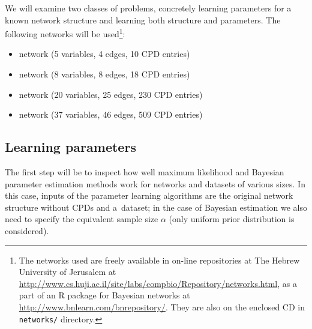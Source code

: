 \documentclass[english,cover]{fitthesis} %
\newcommand{\srccode}[1]{{\tt #1}}         %
\begin{document}
We will examine two classes of problems, concretely learning parameters for a known network structure and learning both structure and parameters. The following networks will be used\footnote{The networks used are freely available in on-line repositories at The Hebrew University of Jerusalem at \url{http://www.cs.huji.ac.il/site/labs/compbio/Repository/networks.html}, as a part of an R package for Bayesian networks at \url{http://www.bnlearn.com/bnrepository/}. They are also on the enclosed CD in \srccode{networks/} directory.}:
\begin{itemize}
	\item {} network (5 variables, 4 edges, 10 CPD entries)
	\item {} network (8 variables, 8 edges, 18 CPD entries)
	\item {} network (20 variables, 25 edges, 230 CPD entries)
	\item {} network (37 variables, 46 edges, 509 CPD entries)
\end{itemize}


\subsection{Learning parameters}
The first step will be to inspect how well maximum likelihood and Bayesian parameter estimation methods work for networks and datasets of various sizes. In this case, inputs of the parameter learning algorithms are the original network structure without CPDs and a~dataset; in the case of Bayesian estimation we also need to specify the equivalent sample size $\alpha$ (only uniform prior distribution is considered).
\end{document}
